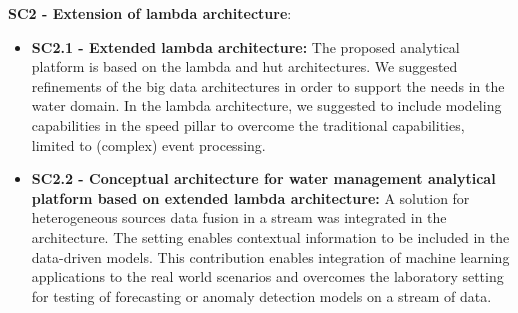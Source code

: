 \noindent \textbf{SC2 - Extension of lambda architecture}: 
\begin{itemize}
    \item \textbf{SC2.1 - Extended lambda architecture:}
        The proposed analytical platform is based on the lambda and hut architectures.
        We suggested refinements of the big data architectures in order to support the needs in the water domain.
        In the lambda architecture, we suggested to include modeling capabilities in the speed pillar to overcome the traditional capabilities, limited to (complex) event processing.
    \item \textbf{SC2.2 - Conceptual architecture for water management analytical platform based on extended lambda architecture:}
        A solution for heterogeneous sources data fusion in a stream was integrated in the architecture.
        The setting enables contextual information to be included in the data-driven models.
        This contribution enables integration of machine learning applications to the real world scenarios and overcomes the laboratory setting for testing of forecasting or anomaly detection models on a stream of data.
        
\end{itemize}

